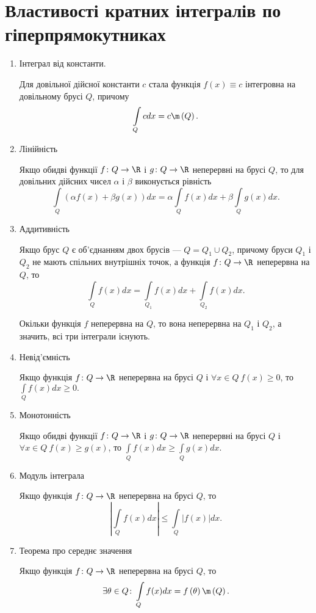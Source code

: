 \section{Властивості кратних інтегралів по гіперпрямокутниках}
\begin{enumerate}
\item Інтеграл від константи.
\begin{intextProposition}
Для довільної дійсної константи $c$ стала функція ${f(x) \equiv c}$ інтегровна на довільному брусі $Q$, причому
\[
\int\limits_{Q} c d x = c\m\left(Q\right).
\]
\end{intextProposition}
\item Лінійність
\begin{intextProposition}
Якщо обидві функції ${f\colon Q \to \R}$ і ${g\colon Q \to \R}$ неперервні на брусі $Q$, то для довільних дійсних чисел $\alpha$ і $\beta$ виконується рівність
\[
\int\limits_{Q} \left(\alpha f(x) + \beta g(x)\right)d x = \alpha\int\limits_{Q} f(x) d x + \beta\int\limits_{Q} g(x) d x.
\]
\end{intextProposition}
\item Аддитивність
\begin{intextProposition}
Якщо брус $Q$ є об'єднанням двох брусів --- ${Q = Q_1 \cup Q_2}$, причому бруси $Q_1$ і $Q_2$ не мають спільних внутрішніх точок, а функція ${f\colon Q \to \R}$ неперервна на $Q$, то
\[
\int\limits_{Q} f(x) d x = \int\limits_{Q_1} f(x) d x + \int\limits_{Q_2} f(x) d x.
\]
\end{intextProposition}
\begin{remark}
Окільки функція ${f}$ неперервна на $Q$, то вона неперервна на $Q_1$ і $Q_2$, а значить, всі три інтеграли існують.
\end{remark}
\item Невід'ємність
\begin{intextProposition}
Якщо функція ${f\colon Q \to \R}$ неперервна на брусі $Q$ і ${\forall x\in Q\ f(x)\geq 0}$, то ${\int\limits_{Q} f(x) d x \geq 0.}$
\end{intextProposition}
\item Монотонність
\begin{intextProposition}
Якщо обидві функції ${f\colon Q \to \R}$ і ${g\colon Q \to \R}$ неперервні на брусі $Q$ і ${\forall x\in Q\ f(x)\geq g(x)}$, то ${\int\limits_{Q} f(x) d x \geq \int\limits_{Q} g(x) d x.}$
\end{intextProposition}
\item Модуль інтеграла
\begin{intextProposition}
Якщо функція ${f\colon Q \to \R}$ неперервна на брусі $Q$, то
\[
\left|\int\limits_{Q} f(x) d x\right| \leq \int\limits_{Q} \left|f(x)\right| d x.
\]
\end{intextProposition}
\item Теорема про середнє значення
\begin{intextProposition}
Якщо функція ${f\colon Q \to \R}$ неперервна на брусі $Q$, то
\[
\exists \theta\in Q\colon \int\limits_{Q} f(x) d x = f\left(\theta\right)\m\left(Q\right).
\]
\end{intextProposition}
\end{enumerate}
